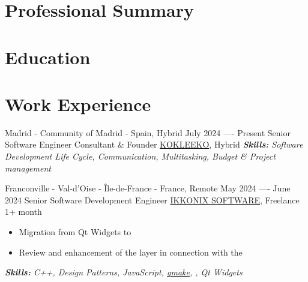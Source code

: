 \documentclass[11pt,a4paper,roman]{moderncv}
\begin{document}
\makecvtitle
\vspace{-2.5\baselineskip}

\renewcommand{\labelitemi}{[-]}

\section{Professional Summary}

\section{Education}

\section{Work Experience}


\cventry
{Madrid - Community of Madrid - Spain, Hybrid}
{July 2024 —- Present}
{Senior Software Engineer Consultant \& Founder}
{\href{https://kokleeko.io}{KOKLEEKO}, Hybrid}
{}
{}
{{\textcolor{color2}{\textit{\textbf{Skills:}
  Software Development Life Cycle,
  Communication, Multitasking,
  Budget \& Project management
  \newline
}}}}

\cventry
{Franconville - Val-d'Oise - Île-de-France - France, Remote}
{May 2024 —- June 2024}
{Senior Software Development Engineer}
{\href{https://ikkonix.com}{IKKONIX SOFTWARE}, Freelance}
{1+ month}
{}
{
\begin{itemize}
	\item Migration from Qt Widgets to 
   \item Review and enhancement of the  layer in connection with the 
\end{itemize}

{\textcolor{color2}{\textit{\textbf{Skills:}
	C++,
	Design Patterns,
	JavaScript,
	\href{https://doc.qt.io/qt-6/qmake-manual.html}{qmake},
   ,
   Qt Widgets
	\newline
}}}}
\end{document}
